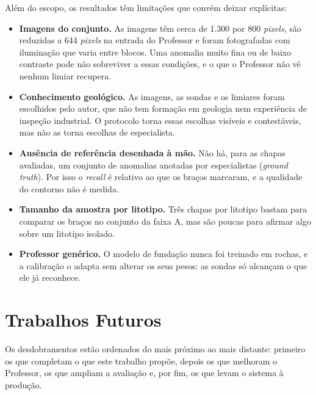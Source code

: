 Além do escopo, os resultados têm limitações que convém deixar explícitas:

\begin{itemize}
  \item \textbf{Imagens do conjunto.} As imagens têm cerca de 1.300 por 800 \textit{pixels}, são reduzidas a 644 \textit{pixels} na entrada do Professor e foram fotografadas com iluminação que varia entre blocos. Uma anomalia muito fina ou de baixo contraste pode não sobreviver a essas condições, e o que o Professor não vê nenhum limiar recupera.
  \item \textbf{Conhecimento geológico.} As imagens, as sondas e os limiares foram escolhidos pelo autor, que não tem formação em geologia nem experiência de inspeção industrial. O protocolo torna essas escolhas visíveis e contestáveis, mas não as torna escolhas de especialista.
  \item \textbf{Ausência de referência desenhada à mão.} Não há, para as chapas avaliadas, um conjunto de anomalias anotadas por especialistas (\textit{ground truth}). Por isso o \textit{recall} é relativo ao que os braços marcaram, e a qualidade do contorno não é medida.
  \item \textbf{Tamanho da amostra por litotipo.} Três chapas por litotipo bastam para comparar os braços no conjunto da faixa A, mas são poucas para afirmar algo sobre um litotipo isolado.
  \item \textbf{Professor genérico.} O modelo de fundação nunca foi treinado em rochas, e a calibração o adapta sem alterar os seus pesos: as sondas só alcançam o que ele já reconhece.
\end{itemize}

\section{Trabalhos Futuros}
\label{sec:futuros}

Os desdobramentos estão ordenados do mais próximo ao mais distante: primeiro os que completam o que este trabalho propõe, depois os que melhoram o Professor, os que ampliam a avaliação e, por fim, os que levam o sistema à produção.

